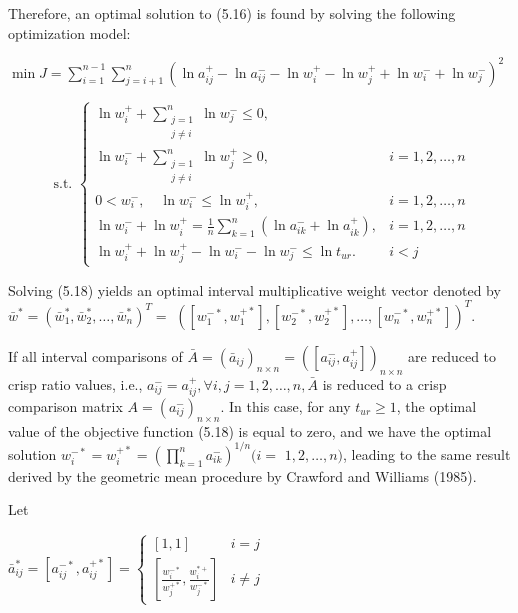\documentclass[10pt]{article}
\begin{document}
Therefore, an optimal solution to (5.16) is found by solving the following optimization model:

$\min J=\sum_{i=1}^{n-1} \sum_{j=i+1}^{n}\left(\ln a_{i j}^{+}-\ln a_{i j}^{-}-\ln w_{i}^{+}-\ln w_{j}^{+}+\ln w_{i}^{-}+\ln w_{j}^{-}\right)^{2}$

$$
\text { s.t. } \begin{cases}\ln w_{i}^{+}+\sum_{\substack{j=1 \\ j \neq i}}^{n} \ln w_{j}^{-} \leq 0, & \\ \ln w_{i}^{-}+\sum_{\substack{j=1 \\ j \neq i}}^{n} \ln w_{j}^{+} \geq 0, & i=1,2, \ldots, n \\ 0<w_{i}^{-}, \quad \ln w_{i}^{-} \leq \ln w_{i}^{+}, & i=1,2, \ldots, n \\ \ln w_{i}^{-}+\ln w_{i}^{+}=\frac{1}{n} \sum_{k=1}^{n}\left(\ln a_{i k}^{-}+\ln a_{i k}^{+}\right), & i=1,2, \ldots, n \\ \ln w_{i}^{+}+\ln w_{j}^{+}-\ln w_{i}^{-}-\ln w_{j}^{-} \leq \ln t_{u r} . & i<j\end{cases}
$$

Solving (5.18) yields an optimal interval multiplicative weight vector denoted by $\bar{w}^{*}=\left(\bar{w}_{1}^{*}, \bar{w}_{2}^{*}, \ldots, \bar{w}_{n}^{*}\right)^{T}=$ $\left(\left[w_{1}^{-*}, w_{1}^{+*}\right],\left[w_{2}^{-*}, w_{2}^{+*}\right], \ldots,\left[w_{n}^{-*}, w_{n}^{+*}\right]\right)^{T}$.

If all interval comparisons of $\bar{A}=\left(\bar{a}_{i j}\right)_{n \times n}=\left(\left[a_{i j}^{-}, a_{i j}^{+}\right]\right)_{n \times n}$ are reduced to crisp ratio values, i.e., $a_{i j}^{-}=a_{i j}^{+}, \forall i, j=1,2, \ldots, n, \bar{A}$ is reduced to a crisp comparison matrix $A=\left(a_{i j}^{-}\right)_{n \times n}$. In this case, for any $t_{u r} \geq 1$, the optimal value of the objective function (5.18) is equal to zero, and we have the optimal solution $w_{i}^{-*}=w_{i}^{+*}=\left(\prod_{k=1}^{n} a_{i k}^{-}\right)^{1 / n}(i=$ $1,2, \ldots, n)$, leading to the same result derived by the geometric mean procedure by Crawford and Williams (1985).

Let

$\bar{a}_{i j}^{*}=\left[a_{i j}^{-*}, a_{i j}^{+*}\right]= \begin{cases}{[1,1]} & i=j \\ {\left[\frac{w_{i}^{-*}}{w_{j}^{+*}}, \frac{w_{i}^{*+}}{w_{j}^{-*}}\right]} & i \neq j\end{cases}$
\end{document}
